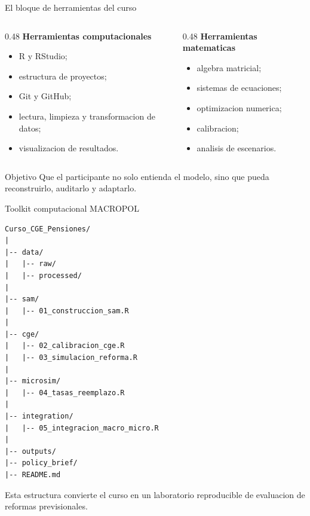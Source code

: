 \documentclass[10pt,aspectratio=169]{beamer}
\begin{document}
\begin{frame}{El bloque de herramientas del curso}
\begin{columns}[T]
\begin{column}{0.48\textwidth}
\textbf{Herramientas computacionales}
\begin{itemize}
  \item R y RStudio;
  \item estructura de proyectos;
  \item Git y GitHub;
  \item lectura, limpieza y transformacion de datos;
  \item visualizacion de resultados.
\end{itemize}
\end{column}
\begin{column}{0.48\textwidth}
\textbf{Herramientas matematicas}
\begin{itemize}
  \item algebra matricial;
  \item sistemas de ecuaciones;
  \item optimizacion numerica;
  \item calibracion;
  \item analisis de escenarios.
\end{itemize}
\end{column}
\end{columns}

\vspace{0.25cm}
\begin{block}{Objetivo}
Que el participante no solo entienda el modelo, sino que pueda reconstruirlo, auditarlo y adaptarlo.
\end{block}
\end{frame}

\begin{frame}[fragile]{Toolkit computacional MACROPOL}
\begin{lstlisting}
Curso_CGE_Pensiones/
|
|-- data/
|   |-- raw/
|   |-- processed/
|
|-- sam/
|   |-- 01_construccion_sam.R
|
|-- cge/
|   |-- 02_calibracion_cge.R
|   |-- 03_simulacion_reforma.R
|
|-- microsim/
|   |-- 04_tasas_reemplazo.R
|
|-- integration/
|   |-- 05_integracion_macro_micro.R
|
|-- outputs/
|-- policy_brief/
|-- README.md
\end{lstlisting}

\vspace{0.1cm}
\small Esta estructura convierte el curso en un laboratorio reproducible de evaluacion de reformas previsionales.
\end{frame}
\end{document}
